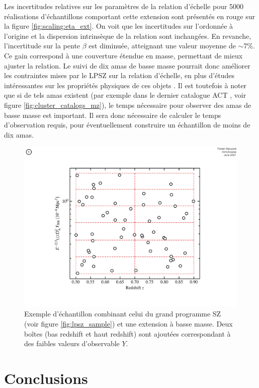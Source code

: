 Les incertitudes relatives sur les paramètres de la relation d'échelle pour 5000 réalisations d'échantillons comportant cette extension sont présentés en rouge sur la figure \ref{fig:scaling:eta_ext}.
On voit que les incertitudes sur l'ordonnée à l'origine et la dispersion intrinsèque de la relation sont inchangées.
En revanche, l'incertitude sur la pente $\beta$ est diminuée, atteignant une valeur moyenne de $\sim$7\%.
Ce gain correspond à une couverture étendue en masse, permettant de mieux ajuster la relation.
Le suivi de dix amas de basse masse pourrait donc améliorer les contraintes mises par le LPSZ sur la relation d'échelle, en plus d'études intéressantes sur les propriétés physiques de ces objets \cite{keruzore_exploiting_2020}.
Il est toutefois à noter que si de tels amas existent (par exemple dans le dernier catalogue ACT \cite{hilton_atacama_2021}, voir figure \ref{fig:cluster_catalogs_mz}), le temps nécessaire pour observer des amas de basse masse est important.
Il sera donc nécessaire de calculer le temps d'observation requis, pour éventuellement construire un échantillon de moins de dix amas.

\begin{figure}[t]
    \centering
    \includegraphics[width=.6\linewidth]{Figures/Chap_scaling/lowm_bin.pdf}
    \caption{
        Exemple d'échantillon combinant celui du grand programme SZ (voir figure \ref{fig:lpsz_sample}) et une extension à basse masse.
        Deux boîtes (bas redshift et haut redshift) sont ajoutées correspondant à des faibles valeurs d'observable $Y$.
    }
    \label{fig:scaling:lpsz_lowm}
\end{figure}

\section{Conclusions}

